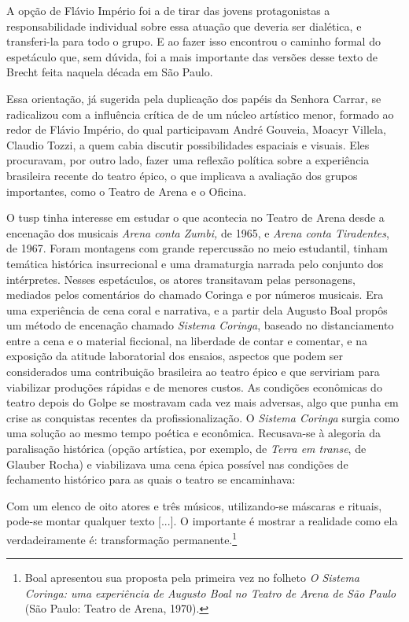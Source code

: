 A opção de Flávio Império foi a de tirar das jovens protagonistas a
responsabilidade individual sobre essa atuação que deveria ser
dialética, e transferi-la para todo o grupo. E ao fazer isso encontrou o
caminho formal do espetáculo que, sem dúvida, foi a mais importante das
versões desse texto de Brecht feita naquela década em São Paulo.

Essa orientação, já sugerida pela duplicação dos papéis da Senhora
Carrar, se radicalizou com a influência crítica de de um núcleo
artístico menor, formado ao redor de Flávio Império, do qual
participavam André Gouveia, Moacyr Villela, Claudio Tozzi, a quem cabia
discutir possibilidades espaciais e visuais. Eles procuravam, por outro
lado, fazer uma reflexão política sobre a experiência brasileira recente
do teatro épico, o que implicava a avaliação dos grupos importantes,
como o Teatro de Arena e o Oficina.

O {\sc tusp} tinha interesse em estudar o que acontecia no Teatro de Arena
desde a encenação dos musicais {\it Arena conta Zumbi,} de 1965, e
{\it Arena conta Tiradentes}, de 1967. Foram montagens com grande
repercussão no meio estudantil, tinham temática histórica insurrecional
e uma dramaturgia narrada pelo conjunto dos intérpretes. Nesses
espetáculos, os atores transitavam pelas personagens, mediados pelos
comentários do chamado Coringa e por números musicais. Era uma
experiência de cena coral e narrativa, e a partir dela Augusto Boal
propôs um método de encenação chamado {\it Sistema Coringa}, baseado no
distanciamento entre a cena e o material ficcional, na liberdade de
contar e comentar, e na exposição da atitude laboratorial dos ensaios,
aspectos que podem ser considerados uma contribuição brasileira ao
teatro épico e que serviriam para viabilizar produções rápidas e de
menores custos. As condições econômicas do teatro depois do Golpe se
mostravam cada vez mais adversas, algo que punha em crise as conquistas
recentes da profissionalização. O {\it Sistema Coringa} surgia como uma
solução ao mesmo tempo poética e econômica. Recusava-se à alegoria da
paralisação histórica (opção artística, por exemplo, de {\it Terra em
transe}, de Glauber Rocha) e viabilizava uma cena épica possível nas
condições de fechamento histórico para as quais o teatro se encaminhava:

\startblockquote
Com um elenco de oito atores e três músicos, utilizando-se máscaras e
rituais, pode-se montar qualquer texto {[}...{]}. O importante é mostrar
a realidade como ela verdadeiramente é: transformação
permanente.\footnote{Boal apresentou sua proposta pela primeira vez no
  folheto {\it O Sistema Coringa: uma experiência de Augusto Boal no
  Teatro de Arena de São Paulo} (São Paulo: Teatro de Arena, 1970).}
\stopblockquote

